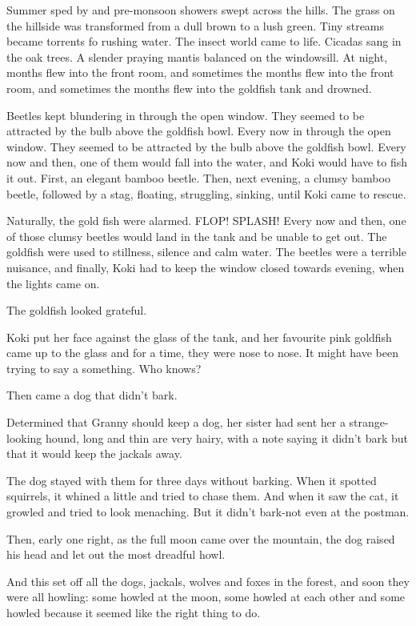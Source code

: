 Summer sped by and pre-monsoon showers swept across the hills. The grass on the hillside was transformed from a dull brown to a lush green. Tiny streams became torrents fo rushing water. The insect world came to life. Cicadas sang in the oak trees. A slender praying mantis balanced on the windowsill. At night, months flew into the front room, and sometimes the months flew into the front room, and sometimes the months flew into the goldfish tank and drowned.
\par
Beetles kept blundering in through the open window. They seemed to be attracted by the bulb above the goldfish bowl. Every now in through the open window. They seemed to be attracted by the bulb above the goldfish bowl. Every now and then, one of them would fall into the water, and Koki would have to fish it out. First, an elegant bamboo beetle. Then, next evening, a clumsy bamboo beetle, followed by a stag, floating, struggling, sinking, until Koki came to rescue.
\par
Naturally, the gold fish were alarmed. FLOP! SPLASH! Every now and then, one of those clumsy beetles would land in the tank and be unable to get out. The goldfish were used to stillness, silence and calm water. The beetles were a terrible nuisance, and finally, Koki had to keep the window closed towards evening, when the lights came on.
\par
The goldfish looked grateful.
\par
Koki put her face against the glass of the tank, and her favourite pink goldfish came up to the glass and for a time, they were nose to nose. It might have been trying to say a something. Who knows?
\par
Then came a dog that didn't bark.
\par
Determined that Granny should keep a dog, her sister had sent her a strange-looking hound, long and thin are very hairy, with a note saying it didn't bark but that it would keep the jackals away.
\par
The dog stayed with them for three days without barking. When it spotted squirrels, it whined a little and tried to chase them. And when it saw the cat, it growled and tried to look menaching. But it didn't bark-not even at the postman.
\par
Then, early one right, as the full moon came over the mountain, the dog raised his head and let out the most dreadful howl.
\par
And this set off all the dogs, jackals, wolves and foxes in the forest, and soon they were all howling: some howled at the moon, some howled at each other and some howled because it seemed like the right thing to do.
